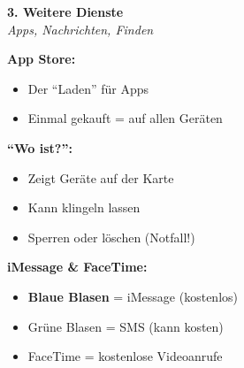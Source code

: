 \documentclass[a4paper,landscape,8pt]{extarticle}
\begin{document}
\begin{minipage}[t]{0.32\linewidth}
\begin{center}
\colorbox{findmygreen!15}{%
\begin{minipage}{0.95\linewidth}
\vspace{2mm}
\begin{center}
{\Large\bfseries\textcolor{findmygreen}{3. Weitere Dienste}}\\[1pt]
{\footnotesize\itshape Apps, Nachrichten, Finden}
\end{center}
\vspace{2mm}
\end{minipage}%
}
\end{center}

\vspace{1mm}

\textbf{App Store:}
\begin{itemize}
\item Der ``Laden'' für Apps
\item Einmal gekauft = auf allen Geräten
\end{itemize}

\textbf{``Wo ist?'':}
\begin{itemize}
\item Zeigt Geräte auf der Karte
\item Kann klingeln lassen
\item Sperren oder löschen (Notfall!)
\end{itemize}

\textbf{iMessage \& FaceTime:}
\begin{itemize}
\item \textbf{Blaue Blasen} = iMessage (kostenlos)
\item Grüne Blasen = SMS (kann kosten)
\item FaceTime = kostenlose Videoanrufe
\end{itemize}

\vspace{2mm}

\end{minipage}

\vspace{1mm}

\begin{center}
\end{center}
\end{document}
